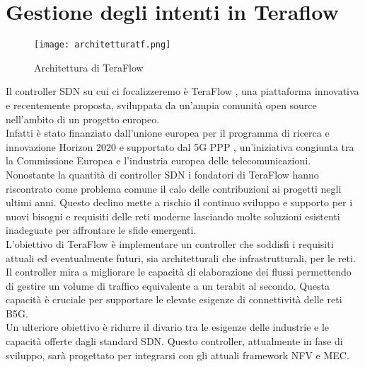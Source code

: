 \chapter{Gestione degli intenti in Teraflow}
\label{cap:teraflow}
\begin{figure}[h]
    \centering
   \texttt{[image: architetturatf.png]}
    \caption{Architettura di TeraFlow \cite{archtfs}}
    \label{fig:tfs}
\end{figure}
Il controller SDN su cui ci focalizzeremo è TeraFlow \cite{TeraFlow}, una piattaforma innovativa e recentemente proposta, sviluppata da un'ampia comunità open source nell'ambito di un progetto europeo. 
\\Infatti è stato finanziato dall'unione europea per il programma di ricerca e innovazione Horizon 2020 \cite{Horizon} e supportato dal 5G PPP \cite{5GPPP}, un'iniziativa congiunta tra la Commissione Europea e l'industria europea delle telecomunicazioni.
Nonostante la quantità di controller SDN i fondatori di TeraFlow hanno riscontrato come problema comune il calo delle contribuzioni ai progetti negli ultimi anni. 
Questo declino mette a rischio il continuo sviluppo e supporto per i nuovi bisogni e requisiti delle reti moderne lasciando molte soluzioni esistenti inadeguate per affrontare le sfide emergenti.
\\L'obiettivo di TeraFlow è implementare un controller che soddisfi i requisiti attuali ed eventualmente futuri, sia architetturali che infrastrutturali, per le reti.
Il controller mira a migliorare le capacità di elaborazione dei flussi permettendo di gestire un volume di traffico equivalente a un terabit al secondo. 
Questa capacità è cruciale per supportare le elevate esigenze di connettività delle reti B5G.
\\Un ulteriore obiettivo è ridurre il divario tra le esigenze delle industrie e le capacità offerte dagli standard SDN.
Questo controller, attualmente in fase di sviluppo, sarà progettato per integrarsi con gli attuali framework NFV e MEC.
